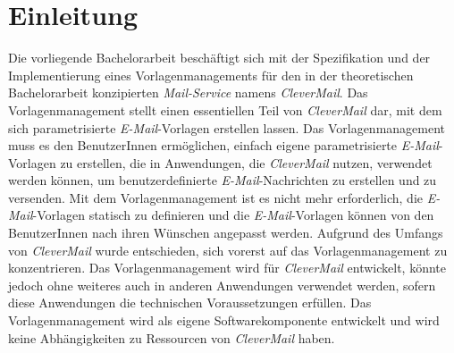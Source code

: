 \chapter{Einleitung}
\label{cha:Einleitung}
Die vorliegende Bachelorarbeit beschäftigt sich mit der Spezifikation und der Implementierung eines Vorlagenmanagements für den in der theoretischen Bachelorarbeit konzipierten \emph{Mail-Service} namens \emph{CleverMail}. Das Vorlagenmanagement stellt einen essentiellen Teil von \emph{CleverMail} dar, mit dem sich parametrisierte \emph{E-Mail}-Vorlagen erstellen lassen. Das Vorlagenmanagement muss es den BenutzerInnen ermöglichen, einfach eigene parametrisierte \emph{E-Mail}-Vorlagen zu erstellen, die in Anwendungen, die \emph{CleverMail} nutzen, verwendet werden können, um benutzerdefinierte \emph{E-Mail}-Nachrichten zu erstellen und zu versenden. Mit dem Vorlagenmanagement ist es nicht mehr erforderlich, die \emph{E-Mail}-Vorlagen statisch zu definieren und die \emph{E-Mail}-Vorlagen können von den BenutzerInnen nach ihren Wünschen angepasst werden.
\newline
\newline
Aufgrund des Umfangs von \emph{CleverMail} wurde entschieden, sich vorerst auf das Vorlagenmanagement zu konzentrieren. Das Vorlagenmanagement wird für \emph{CleverMail} entwickelt, könnte jedoch ohne weiteres auch in anderen Anwendungen verwendet werden, sofern diese Anwendungen die technischen Voraussetzungen erfüllen. Das Vorlagenmanagement wird als eigene Softwarekomponente entwickelt und wird keine Abhängigkeiten zu Ressourcen von \emph{CleverMail} haben.

